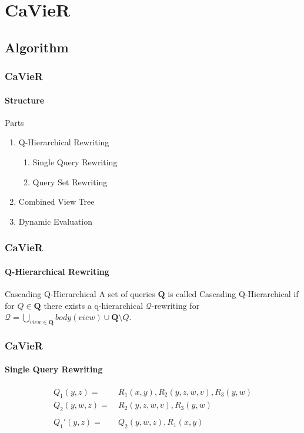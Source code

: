 \documentclass[
	11pt, %
]{beamer}
\begin{document}
\section{CaVieR}
\subsection{Algorithm}
\begin{frame}
	\frametitle{CaVieR }
	\framesubtitle{Structure}
	\begin{block}{Parts}
		\begin{enumerate}
			\item Q-Hierarchical Rewriting
			\begin{enumerate}
				\item Single Query Rewriting
				\item Query Set Rewriting
			\end{enumerate}
			\item Combined View Tree
			\item Dynamic Evaluation
		\end{enumerate}
	\end{block}
\end{frame}

\begin{frame}
	\frametitle{CaVieR}
	\framesubtitle{Q-Hierarchical Rewriting}
	\begin{block}{Cascading Q-Hierarchical}
	    A set of queries $\mathbf{Q}$ is called Cascading Q-Hierarchical if for $Q \in \mathbf{Q}$ there exists a q-hierarchical $\mathcal{Q}$-rewriting for $\mathcal{Q} = \bigcup_{view \in \mathbf{Q}}body(view) \cup \mathbf{Q}\setminus Q$.
	\end{block}
\end{frame}

\begin{frame}
	\frametitle{CaVieR}
	\framesubtitle{Single Query Rewriting}
	\begin{figure}
		\begin{align*}
			Q_1(y,z) =&\ R_1(x, y), R_2(y,z,w,v), R_3(y,w)\\
			Q_2(y,w,z) =&\ R_2(y,z,w,v), R_3(y,w)\\\\
			Q_1'(y,z) =&\ Q_2(y,w,z), R_1(x, y)
		\end{align*}
	\end{figure}
\end{frame}
\end{document}
